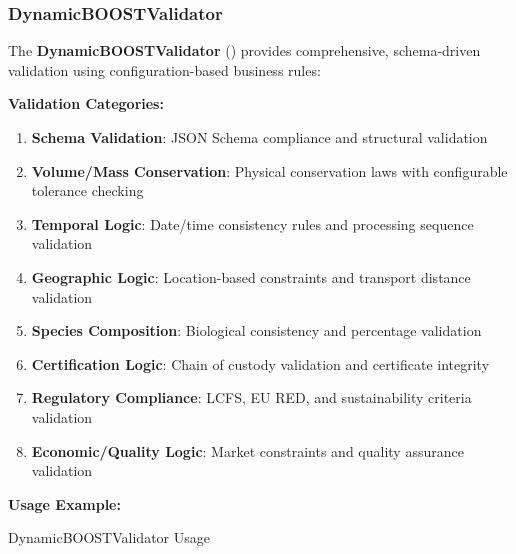 \subsubsection{DynamicBOOSTValidator}
\label{sec:python-validator}

The \textbf{DynamicBOOSTValidator} () provides comprehensive, schema-driven validation using configuration-based business rules:

\textbf{Validation Categories:}
\begin{enumerate}
    \item \textbf{Schema Validation}: JSON Schema compliance and structural validation
    \item \textbf{Volume/Mass Conservation}: Physical conservation laws with configurable tolerance checking
    \item \textbf{Temporal Logic}: Date/time consistency rules and processing sequence validation
    \item \textbf{Geographic Logic}: Location-based constraints and transport distance validation
    \item \textbf{Species Composition}: Biological consistency and percentage validation
    \item \textbf{Certification Logic}: Chain of custody validation and certificate integrity
    \item \textbf{Regulatory Compliance}: LCFS, EU RED, and sustainability criteria validation
    \item \textbf{Economic/Quality Logic}: Market constraints and quality assurance validation
\end{enumerate}

\textbf{Usage Example:}

\begin{pythonexample}{DynamicBOOSTValidator Usage}
\end{pythonexample}


